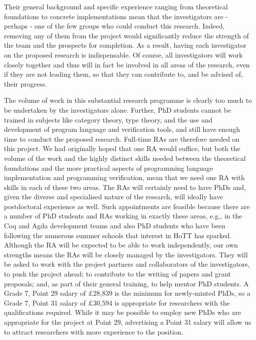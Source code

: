 \documentclass[a4paper,11pt]{article}
\begin{document}
Their general background and specific experience ranging from
theoretical foundations to concrete implementations mean that the
investigators are - perhaps - one of the few groups who could conduct
this research. Indeed, removing any of them from the project would
significantly reduce the strength of the team and the prospects for
completion.
As a result, having each
investigator on the proposed research is indispensable. Of course, all
investigators will work closely together and thus will in fact be
involved in all areas of the research, even if they are not leading
them, so that they can contribute to, and be advised of, their
progress.



\vspace{0.02in}

 The volume of work in this substantial
research programme is clearly too much to be undertaken by the
investigators alone. Further, PhD students cannot be trained in
subjects like category theory, type theory, and the use and
development of program language and verification tools, and still have
enough time to conduct the proposed research. Full-time RAs are
therefore needed on this project. We had originally hoped that one RA
would suffice, but both the volume of the work and the highly distinct
skills needed between the theoretical foundations and the more
practical aspects of programming language implementation and
programming verification, mean that we need one RA with skills in each
of these two areas.  The RAs will certainly need to have PhDs and,
given the diverse and specialised nature of the research, will ideally
have postdoctoral experience as well.  Such appointments are feasible
because there are a number of PhD students and RAs working in exactly
these areas, e.g., in the Coq and Agda development teams and also PhD
students who have been following the numerous summer schools that
interest in HoTT has sparked.  Although the RA will be expected to be
able to work independently, our own strengths means the RAs will be
closely managed by the investigators. They will be asked to work with
the project partners and collaborators of the investigators, to push the project ahead; to
contribute to the writing of papers and grant proposals; and, as part
of their general training, to help mentor PhD students. A Grade 7,
Point 29 salary of $\pounds$28,839 is the minimum for newly-minted
PhDs, so a Grade 7, Point 31 salary of $\pounds$30,594 is appropriate
for researchers with the qualifications required. While it may be
possible to employ new PhDs who are appropriate for the project at
Point 29, advertising a Point 31 salary will allow us to attract
researchers with more experience to the position. 
\end{document}
